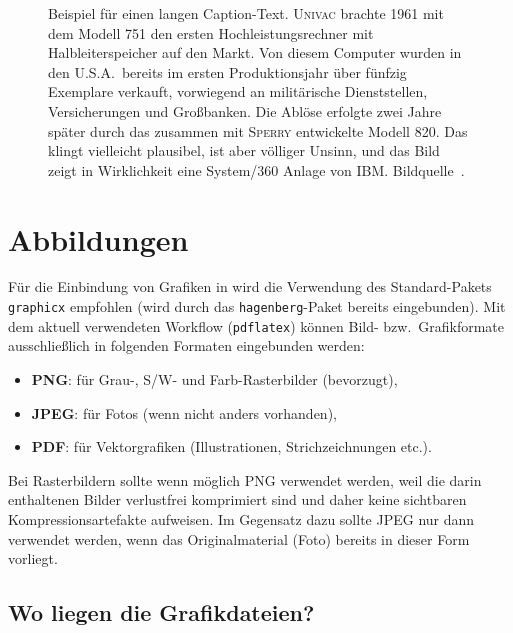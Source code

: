 \begin{figure}
\centering
{}  %
\caption{Beispiel für einen langen Caption-Text. \textsc{Univac}
brachte 1961 mit dem Modell 751 den ersten Hochleistungsrechner
mit Halbleiterspeicher auf den Markt. Von diesem Computer wurden
in den U.S.A.\ bereits im ersten Produktionsjahr über fünfzig
Exemplare verkauft, vorwiegend an militärische Dienststellen,
Versicherungen und Großbanken. Die Ablöse erfolgte zwei Jahre
später durch das zusammen mit \textsc{Sperry} entwickelte Modell 820.
Das klingt vielleicht plausibel, ist aber völliger Unsinn, und das
Bild zeigt in Wirklichkeit eine System/360 Anlage von IBM. 
Bildquelle~\cite{IBM360}.} 
\label{fig:ibm360}
\end{figure}





\section{Abbildungen}

Für die Einbindung von Grafiken in \latex wird die Verwendung des Stan\-dard-Pakets
\texttt{graphicx} \cite{Carlisle2016} empfohlen 
(wird durch das \texttt{hagenberg}-Paket bereits eingebunden). 
Mit dem aktuell verwendeten Workflow (\texttt{pdflatex})
können Bild- bzw.\ Grafikformate ausschließlich 
in folgenden Formaten eingebunden werden:
%
\begin{itemize}
	\item \textbf{PNG}: für Grau-, S/W- und Farb-Rasterbilder (bevorzugt),
	\item \textbf{JPEG}: für Fotos (wenn nicht anders vorhanden),
	\item \textbf{PDF}: für Vektorgrafiken (Illustrationen, Strichzeichnungen etc.).
\end{itemize}
%
Bei Rasterbildern sollte wenn möglich PNG verwendet werden, weil die darin 
enthaltenen Bilder verlustfrei komprimiert sind und daher keine sichtbaren Kompressionsartefakte
aufweisen. Im Gegensatz dazu sollte JPEG nur dann verwendet werden, wenn das Originalmaterial
(Foto) bereits in dieser Form vorliegt.


\subsection{Wo liegen die Grafikdateien?} 

